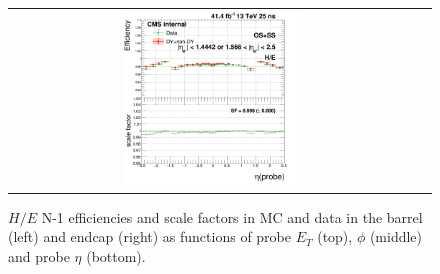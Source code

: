 \begin{figure}[bh]
\begin{center}
\begin{tabular}{cc}
      \includegraphics[width=0.45\textwidth]{figures/Zprime/2017/ScaleFactor/SameSign/N-1/g_compare_cut_eta_Barrel+Endcap_ea_ta_inc_AS_N_1_HoE_PUW.png}
    \end{tabular}
    \caption{$H/E$ N-1 efficiencies and scale factors in MC and data in the barrel (left) and endcap (right) as functions of probe $E_T$ (top), $\phi$ (middle) and probe $\eta$ (bottom).}
    \label{fig:HoE_2017}
  \end{center}
\end{figure}

